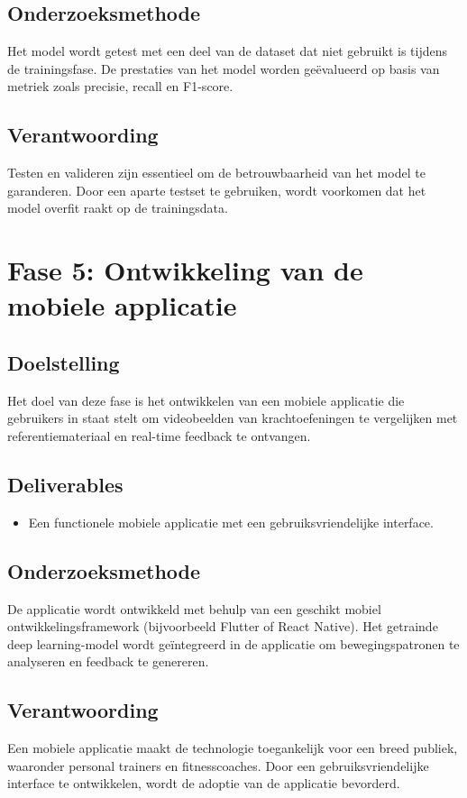 \subsection{Onderzoeksmethode}
Het model wordt getest met een deel van de dataset dat niet gebruikt is tijdens de trainingsfase. De prestaties van het model worden geëvalueerd op basis van metriek zoals precisie, recall en F1-score.  

\subsection{Verantwoording}
Testen en valideren zijn essentieel om de betrouwbaarheid van het model te garanderen. Door een aparte testset te gebruiken, wordt voorkomen dat het model overfit raakt op de trainingsdata.  

\section{Fase 5: Ontwikkeling van de mobiele applicatie}
\subsection{Doelstelling}
Het doel van deze fase is het ontwikkelen van een mobiele applicatie die gebruikers in staat stelt om videobeelden van krachtoefeningen te vergelijken met referentiemateriaal en real-time feedback te ontvangen.  

\subsection{Deliverables}
\begin{itemize}
    \item Een functionele mobiele applicatie met een gebruiksvriendelijke interface.
\end{itemize}

\subsection{Onderzoeksmethode}
De applicatie wordt ontwikkeld met behulp van een geschikt mobiel ontwikkelingsframework (bijvoorbeeld Flutter of React Native). Het getrainde deep learning-model wordt geïntegreerd in de applicatie om bewegingspatronen te analyseren en feedback te genereren.  

\subsection{Verantwoording}
Een mobiele applicatie maakt de technologie toegankelijk voor een breed publiek, waaronder personal trainers en fitnesscoaches. Door een gebruiksvriendelijke interface te ontwikkelen, wordt de adoptie van de applicatie bevorderd.  

